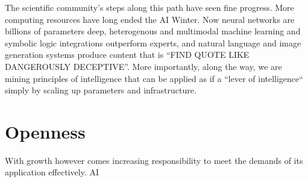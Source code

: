 \documentclass[twocolumn, switch]{article} %
\begin{document}
The scientific community's steps along this path have seen fine progress. More computing resources have long ended the AI Winter. Now neural networks are billions of parameters deep, heterogenous and multimodal machine learning and symbolic logic integrations outperform experts, and natural language and image generation systems produce content that is ``FIND QUOTE LIKE DANGEROUSLY DECEPTIVE''. More importantly, along the way, we are mining principles of intelligence that can be applied as if a ``lever of intelligence`` simply by scaling up parameters and infrastructure. 

\section{Openness}

With growth however comes increasing responsibility to meet the demands of its application effectively. AI



\normalsize



\end{document}
